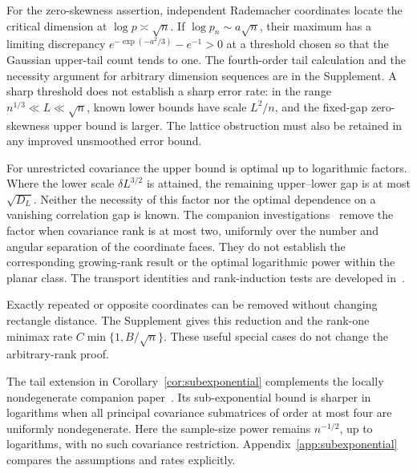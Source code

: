 \documentclass[11pt,letterpaper]{article}
\theoremstyle{remark}
\begin{document}
For the zero-skewness assertion, independent Rademacher coordinates
locate the critical dimension at
\(\log p\asymp\sqrt n\). If \(\log p_n\sim a\sqrt n\), their
maximum has a limiting discrepancy
\(e^{-\exp(-a^2/3)}-e^{-1}>0\) at a threshold chosen so that the
Gaussian upper-tail count tends to one. The fourth-order tail
calculation and the necessity argument for
arbitrary dimension sequences are in the Supplement. A sharp threshold
does not establish a sharp error rate: in the range
\(n^{1/3}\ll L\ll\sqrt n\), known lower bounds have scale
\(L^2/n\), and the fixed-gap zero-skewness upper bound is larger.
The lattice obstruction must also be retained in any improved
unsmoothed error bound.

For unrestricted covariance the upper bound is optimal up to
logarithmic factors. Where the lower scale \(\delta L^{3/2}\) is
attained, the remaining upper--lower gap is at most
\(\sqrt{D_L}\). Neither the necessity of this factor nor the optimal
dependence on a vanishing correlation gap is known. The companion
investigations~\cite{Cancellation} remove the factor when covariance
rank is at most two, uniformly over the number and angular separation
of the coordinate faces. They do not establish the corresponding
growing-rank result or the optimal logarithmic power within the planar
class. The transport identities and rank-induction tests are developed
in~\cite{Cancellation}.

Exactly repeated or opposite coordinates can be removed without
changing rectangle distance. The Supplement gives this reduction and
the rank-one minimax rate \(C\min\{1,B/\sqrt n\}\). These useful
special cases do not change the arbitrary-rank proof.

The tail extension in Corollary~\ref{cor:subexponential} complements the
locally nondegenerate companion paper~\cite{Local}. Its sub-exponential
bound is sharper in logarithms when all principal covariance submatrices
of order at most four are uniformly nondegenerate. Here the sample-size
power remains \(n^{-1/2}\), up to logarithms, with no such covariance
restriction. Appendix~\ref{app:subexponential} compares the assumptions and rates explicitly.
\end{document}
